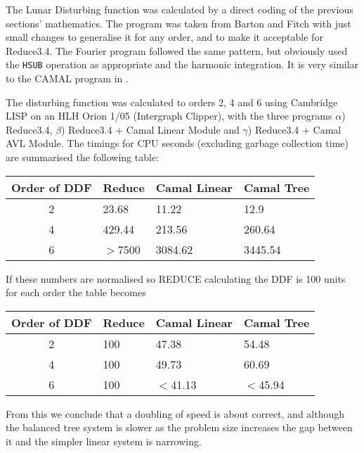 The Lunar Disturbing function was calculated by a direct coding of the
previous sections' mathematics.  The program was taken from Barton
and Fitch \cite{Barton72} with just small changes to generalise it for
any order, and to make it acceptable for Reduce3.4.  The Fourier
program followed the same pattern, but obviously used the \texttt{HSUB}
operation as appropriate and the harmonic integration.  It is very
similar to the CAMAL program in \cite{Barton72}.

The disturbing function was calculated to orders 2, 4 and 6 using
Cambridge LISP on an HLH Orion 1/05 (Intergraph Clipper), with the
three programs $\alpha$) Reduce3.4, $\beta$) Reduce3.4 + Camal Linear
Module and $\gamma$) Reduce3.4 + Camal AVL Module.  The timings for
CPU seconds (excluding garbage collection time) are summarised the
following table:
\medskip
\begin{center}
\begin{tabular}{ | c || l | l | l |}
\hline
Order of DDF    & Reduce        & Camal Linear  & Camal Tree \\
\hline
2       &       23.68   &       11.22   &       12.9    \\
4       &       429.44  &       213.56  &       260.64  \\
6       &       $>$7500 &       3084.62 &       3445.54 \\
\hline
\end{tabular}
\end{center}
\medskip

If these numbers are normalised so REDUCE calculating the DDF is 100
units for each order the table becomes
\medskip
\begin{center}
\begin{tabular}{ | c || l | l | l |}
\hline
Order of DDF    & Reduce        & Camal Linear  & Camal Tree \\ \hline
2       &       100     &       47.38   &       54.48   \\
4       &       100     &       49.73   &       60.69   \\
6       &       100     &       $<$41.13        &       $<$45.94 \\
\hline
\end{tabular}
\end{center}
\medskip

From this we conclude that a doubling of speed is about correct, and
although the balanced tree system is slower as the problem size
increases the gap between it and the simpler linear system is
narrowing.

